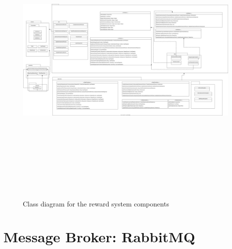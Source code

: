 \begin{landscape}
    \begin{figure}[H]
        \centering
        \includegraphics[width=26cm, height=15cm]{src/assets/diagrams/nestclass.png}
        \caption{Class diagram for the reward system components}
        \label{fig:class-reward-system}
    \end{figure}
\end{landscape}

\section{Message Broker: RabbitMQ}


 
